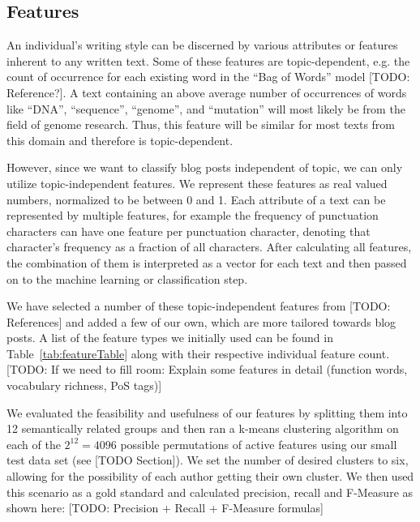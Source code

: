 \subsection{Features}
\label{sec:feautres}

An individual's writing style can be discerned by various attributes or features inherent to any written text.
Some of these features are topic-dependent, e.g. the count of occurrence for each existing word in the “Bag of Words” model [TODO: Reference?].
A text containing an above average number of occurrences of words like “DNA”, “sequence”, “genome”, and “mutation” will most likely be from the field of genome research.
Thus, this feature will be similar for most texts from this domain and therefore is topic-dependent.


However, since we want to classify blog posts independent of topic, we can only utilize topic-independent features.
We represent these features as real valued numbers, normalized to be between 0 and 1.
Each attribute of a text can be represented by multiple features, for example the frequency of punctuation characters can have one feature per punctuation character, denoting that character's frequency as a fraction of all characters.
After calculating all features, the combination of them is interpreted as a vector for each text and then passed on to the machine learning or classification step.


We have selected a number of these topic-independent features from [TODO: References] and added a few of our own, which are more tailored towards blog posts.
A list of the feature types we initially used can be found in Table~\ref{tab:featureTable} along with their respective individual feature count.
[TODO: If we need to fill room: Explain some features in detail (function words, vocabulary richness, PoS tags)]


We evaluated the feasibility and usefulness of our features by splitting them into 12 semantically related groups and then ran a k-means clustering algorithm on each of the $2^{12} = 4096$ possible permutations of active features using our small test data set (see [TODO Section]).
We set the number of desired clusters to six, allowing for the possibility of each author getting their own cluster. 
We then used this scenario as a gold standard and calculated precision, recall and F-Measure as shown here: [TODO: Precision + Recall + F-Measure formulas]


